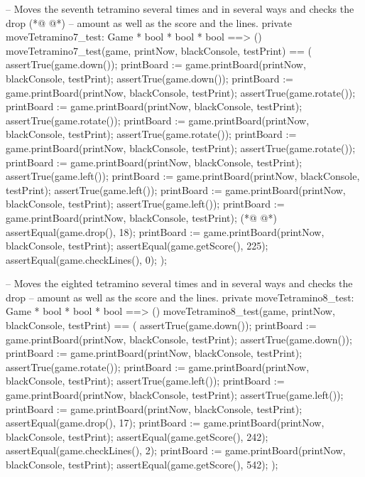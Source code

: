 \begin{vdmpp}[breaklines=true]
  -- Moves the seventh tetramino several times and in several ways and checks the drop
(*@
\label{moveTetramino8:test:451}
@*)
  -- amount as well as the score and the lines.
  private moveTetramino7_test: Game * bool * bool * bool ==> ()
  moveTetramino7_test(game, printNow, blackConsole, testPrint) == (
   assertTrue(game.down());
   printBoard := game.printBoard(printNow, blackConsole, testPrint);
   assertTrue(game.down());
   printBoard := game.printBoard(printNow, blackConsole, testPrint);
   assertTrue(game.rotate());
   printBoard := game.printBoard(printNow, blackConsole, testPrint);
   assertTrue(game.rotate());
   printBoard := game.printBoard(printNow, blackConsole, testPrint);
   assertTrue(game.rotate());
   printBoard := game.printBoard(printNow, blackConsole, testPrint);
   assertTrue(game.rotate());
   printBoard := game.printBoard(printNow, blackConsole, testPrint);
   assertTrue(game.left());
   printBoard := game.printBoard(printNow, blackConsole, testPrint);
   assertTrue(game.left());
   printBoard := game.printBoard(printNow, blackConsole, testPrint);
   assertTrue(game.left());
   printBoard := game.printBoard(printNow, blackConsole, testPrint);
(*@
\label{play:test:472}
@*)
   assertEqual(game.drop(), 18);
   printBoard := game.printBoard(printNow, blackConsole, testPrint);
   assertEqual(game.getScore(), 225);
   assertEqual(game.checkLines(), 0);
  );
  
  -- Moves the eighted tetramino several times and in several ways and checks the drop
  -- amount as well as the score and the lines.
  private moveTetramino8_test: Game * bool * bool * bool ==> ()
  moveTetramino8_test(game, printNow, blackConsole, testPrint) == (
   assertTrue(game.down());
   printBoard := game.printBoard(printNow, blackConsole, testPrint);
   assertTrue(game.down());
   printBoard := game.printBoard(printNow, blackConsole, testPrint);
   assertTrue(game.rotate());
   printBoard := game.printBoard(printNow, blackConsole, testPrint);
   assertTrue(game.left());
   printBoard := game.printBoard(printNow, blackConsole, testPrint);
   assertTrue(game.left());
   printBoard := game.printBoard(printNow, blackConsole, testPrint);
   assertEqual(game.drop(), 17);
   printBoard := game.printBoard(printNow, blackConsole, testPrint);
   assertEqual(game.getScore(), 242);
   assertEqual(game.checkLines(), 2);
   printBoard := game.printBoard(printNow, blackConsole, testPrint);
   assertEqual(game.getScore(), 542);
  );


\end{vdmpp}
